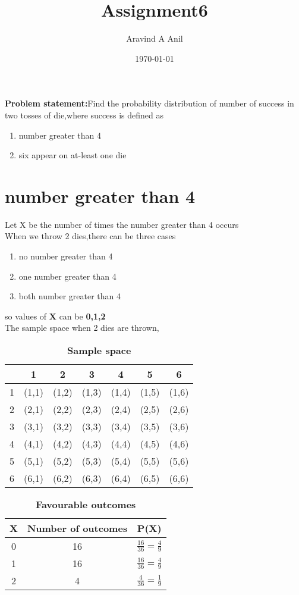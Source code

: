 \documentclass[11pt,a4paper,twocolumn]{article}
\title{Assignment6}
\author{Aravind A Anil}
\date{\today}
\begin{document}
\maketitle
\begin{flushleft}
\textbf{Problem statement:}Find the probability distribution of number of success in two tosses of die,where success is defined as
\begin{enumerate}[i]
    \item number greater than 4
    \item six appear on at-least one die
\end{enumerate}
\section{number greater than 4}
Let X be the number of times the number greater than 4 occurs\\
When we throw 2 dies,there can be three cases
\begin{enumerate}
    \item no number greater than 4
    \item one number greater than 4
    \item both number greater than 4
\end{enumerate}
so values of \textbf{X} can be \textbf{0,1,2}\\
The sample space when 2 dies are thrown,
\begin{table}[h]
    \centering
    \begin{tabular}{|c|c|c|c|c|c|c|}
    \hline
         &1&2&3&4&5&6\\  
         \hline
         1&(1,1)&(1,2)&(1,3)&(1,4)&(1,5)&(1,6)\\
         \hline
         2&(2,1)&(2,2)&(2,3)&(2,4)&(2,5)&(2,6)\\
         \hline
         3&(3,1)&(3,2)&(3,3)&(3,4)&(3,5)&(3,6)\\
         \hline
         4&(4,1)&(4,2)&(4,3)&(4,4)&(4,5)&(4,6)\\
         \hline
         5&(5,1)&(5,2)&(5,3)&(5,4)&(5,5)&(5,6)\\
         \hline
         6&(6,1)&(6,2)&(6,3)&(6,4)&(6,5)&(6,6)\\
         \hline
         
    \end{tabular}
    \caption{\textbf{Sample space}}
\end{table}
\end{flushleft}
\begin{table}[ht]
\centering
    \begin{tabular}{|c|c|c|}
    \hline
        X &Number of outcomes&P(X)\\[5pt]
        \hline
    0&16&$\frac{16}{36}=\frac{4}{9}$\\[5pt]
    \hline
    1&16&$\frac{16}{36}=\frac{4}{9}$\\[5pt]
    \hline
    2&4&$\frac{4}{36}=\frac{1}{9}$\\[5pt]
    \hline
    \end{tabular}
    \caption{\textbf{Favourable outcomes}}
\end{table}
\end{document}
